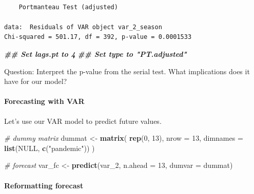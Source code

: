 \documentclass[
]{article}
\newenvironment{Shaded}{\begin{snugshade}}{\end{snugshade}}
\newcommand{\AttributeTok}[1]{\textcolor[rgb]{0.13,0.29,0.53}{#1}}
\newcommand{\CommentTok}[1]{\textcolor[rgb]{0.56,0.35,0.01}{\textit{#1}}}
\newcommand{\ConstantTok}[1]{\textcolor[rgb]{0.56,0.35,0.01}{#1}}
\newcommand{\DecValTok}[1]{\textcolor[rgb]{0.00,0.00,0.81}{#1}}
\newcommand{\DocumentationTok}[1]{\textcolor[rgb]{0.56,0.35,0.01}{\textbf{\textit{#1}}}}
\newcommand{\FunctionTok}[1]{\textcolor[rgb]{0.13,0.29,0.53}{\textbf{#1}}}
\newcommand{\NormalTok}[1]{#1}
\newcommand{\OtherTok}[1]{\textcolor[rgb]{0.56,0.35,0.01}{#1}}
\newcommand{\StringTok}[1]{\textcolor[rgb]{0.31,0.60,0.02}{#1}}
\begin{document}
\begin{verbatim}

    Portmanteau Test (adjusted)

data:  Residuals of VAR object var_2_season
Chi-squared = 501.17, df = 392, p-value = 0.0001533
\end{verbatim}

\begin{Shaded}
\begin{Highlighting}[]
\DocumentationTok{\#\# Set \textquotesingle{}lags.pt\textquotesingle{} to \textasciigrave{}4\textasciigrave{}}
\DocumentationTok{\#\# Set \textquotesingle{}type\textquotesingle{} to "PT.adjusted"}
\end{Highlighting}
\end{Shaded}

Question: Interpret the p-value from the serial test. What implications
does it have for our model?

\hypertarget{forecasting-with-var}{%
\paragraph{Forecasting with VAR}\label{forecasting-with-var}}

Let's use our VAR model to predict future values.

\begin{Shaded}
\begin{Highlighting}[]
\CommentTok{\# dummy matrix}
\NormalTok{dummat }\OtherTok{\textless{}{-}} \FunctionTok{matrix}\NormalTok{(}
  \FunctionTok{rep}\NormalTok{(}\DecValTok{0}\NormalTok{, }\DecValTok{13}\NormalTok{), }\AttributeTok{nrow =} \DecValTok{13}\NormalTok{,}
  \AttributeTok{dimnames =} \FunctionTok{list}\NormalTok{(}\ConstantTok{NULL}\NormalTok{, }\FunctionTok{c}\NormalTok{(}\StringTok{"pandemic"}\NormalTok{))}
\NormalTok{)}

\CommentTok{\# forecast}
\NormalTok{var\_fc }\OtherTok{\textless{}{-}} \FunctionTok{predict}\NormalTok{(var\_2, }\AttributeTok{n.ahead =} \DecValTok{13}\NormalTok{, }\AttributeTok{dumvar =}\NormalTok{ dummat)}
\end{Highlighting}
\end{Shaded}

\hypertarget{reformatting-forecast}{%
\paragraph{Reformatting forecast}\label{reformatting-forecast}}
\end{document}
